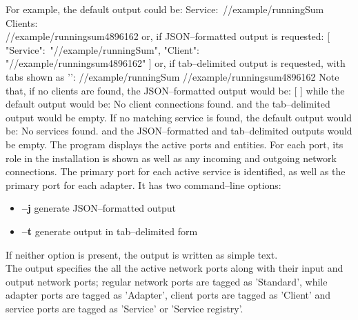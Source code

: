 For example, the default output could be:
\outputBegin{}
Service:\ /\serviceName/example/runningSum\\
\settowidth{\utilLen}{Service:\ }%
Clients:\\
\hspace*{\utilLen}/\clientName/example/runningsum\textunderscore{}4896162
\outputEnd{}
or, if JSON--formatted output is requested:
\outputBegin{}
[ \textbraceleft{} "Service":\ "/\serviceName/example/runningSum", "Client":\ \\
"/\clientName/example/runningsum\textunderscore{}4896162" \textbraceright{} ]
\outputEnd{}
or, if tab--delimited output is requested, with tabs shown as
'\texttt{\boldmath{$\vdash$}}':
\outputBegin{}
/\serviceName/example/runningSum\pseudotab{}%
/\clientName/example/runningsum\textunderscore{}4896162
\outputEnd{}
Note that, if no clients are found, the JSON--formatted output would be:
\outputBegin{}
[  ]
\outputEnd{}
while the default output would be:
\outputBegin{}
No client connections found.
\outputEnd{}
and the tab--delimited output would be empty.
If no matching service is found, the default output would be:
\outputBegin{}
No services found.
\outputEnd{}
and the JSON--formatted and tab--delimited outputs would be empty.
The program  displays the active \yarp{} ports and \mplusm{}
entities.
For each \yarp{} port, its role in the \mplusm{} installation is shown as well as any
incoming and outgoing \yarp{} network connections.
The primary port for each active service is identified, as well as the primary port for
each adapter.
It has two command--line options:
\begin{itemize}
\item \textbf{--j} generate JSON--formatted output
\item \textbf{--t} generate output in tab--delimited form
\end{itemize}
If neither option is present, the output is written as simple text.\\

The output specifies the all the active \yarp{} network ports along with their input and
output \yarp{} network ports; regular \yarp{} network ports are tagged as 'Standard',
while \mplusm{} adapter ports are tagged as 'Adapter', \mplusm{} client ports are tagged
as 'Client' and \mplusm{} service ports are tagged as 'Service' or 'Service registry'.\\

